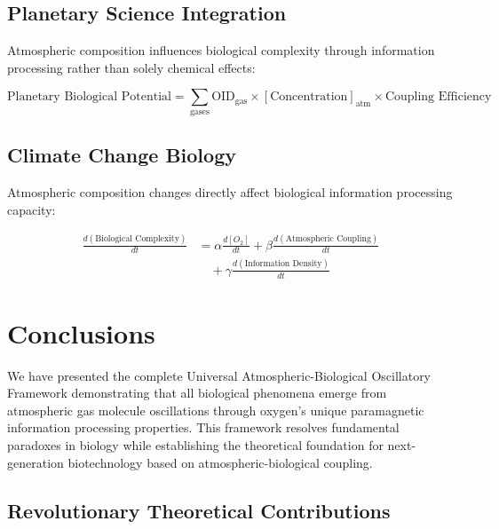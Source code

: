 \documentclass[twocolumn]{article}
\begin{document}
\subsection{Planetary Science Integration}

Atmospheric composition influences biological complexity through information processing rather than solely chemical effects:

\begin{equation}
\text{Planetary Biological Potential} = \sum_{\text{gases}} \text{OID}_{\text{gas}} \times [\text{Concentration}]_{\text{atm}} \times \text{Coupling Efficiency}
\end{equation}

\subsection{Climate Change Biology}

Atmospheric composition changes directly affect biological information processing capacity:

\begin{align}
\frac{d(\text{Biological Complexity})}{dt} &= \alpha \frac{d[O_2]}{dt} + \beta \frac{d(\text{Atmospheric Coupling})}{dt} \\
&\quad + \gamma \frac{d(\text{Information Density})}{dt}
\end{align}

\section{Conclusions}

We have presented the complete Universal Atmospheric-Biological Oscillatory Framework demonstrating that all biological phenomena emerge from atmospheric gas molecule oscillations through oxygen's unique paramagnetic information processing properties. This framework resolves fundamental paradoxes in biology while establishing the theoretical foundation for next-generation biotechnology based on atmospheric-biological coupling.

\subsection{Revolutionary Theoretical Contributions}
\end{document}
